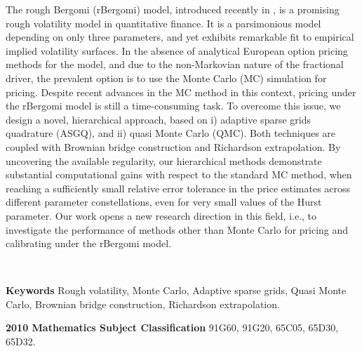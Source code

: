 The rough Bergomi (rBergomi) model, introduced recently in  \cite{bayer2016pricing}, is a promising rough volatility model in quantitative finance. It is a parsimonious model depending on only three parameters, and yet exhibits remarkable fit to empirical implied volatility surfaces. In the absence of analytical European option pricing methods for the model, and due to the non-Markovian nature of the fractional driver, the prevalent option is to use the Monte Carlo (MC) simulation for pricing. Despite recent advances in the MC method in this context, pricing under the rBergomi model is still a time-consuming task. To overcome this issue, we design a novel,  hierarchical approach, based on i) adaptive sparse grids quadrature (ASGQ), and ii) quasi Monte Carlo (QMC). Both techniques are coupled with Brownian bridge construction and Richardson extrapolation. By uncovering the available regularity,  our hierarchical methods demonstrate substantial computational gains with respect to the standard MC method, when reaching a sufficiently small relative error tolerance in the price estimates across different parameter constellations, even for very small values of the Hurst  parameter. Our work opens a new research direction in this field, i.e., to investigate the performance of  methods  other than Monte Carlo for pricing and calibrating under the rBergomi model.

\

\textbf{Keywords} Rough volatility, Monte Carlo, Adaptive sparse grids, Quasi Monte Carlo, Brownian bridge construction, Richardson extrapolation.

\textbf{2010 Mathematics Subject Classification} 	91G60, 	91G20, 65C05, 65D30, 65D32.